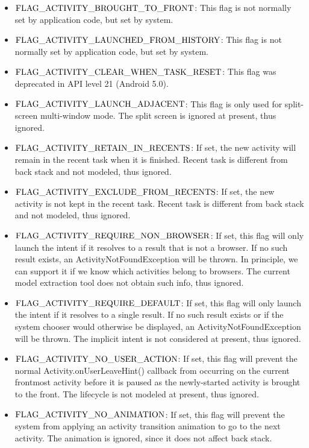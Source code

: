 {
\begin{itemize}
    \item $\rm FLAG\_ACTIVITY\_BROUGHT\_TO\_FRONT$: This flag is not normally set by application code, but set by system.
    \item $\rm FLAG\_ACTIVITY\_LAUNCHED\_FROM\_HISTORY$: This flag is not normally set by application code, but set by system.
%
    \item $\rm FLAG\_ACTIVITY\_CLEAR\_WHEN\_TASK\_RESET$: This flag was deprecated in API level 21 (Android 5.0).
%
    \item $\rm FLAG\_ACTIVITY\_LAUNCH\_ADJACENT$: This flag is only used for split-screen multi-window mode. The split screen is ignored at present, thus ignored.
%
    \item $\rm FLAG\_ACTIVITY\_RETAIN\_IN\_RECENTS$: If set, the new activity will remain in the recent task when it is finished. Recent task is different from back stack and not modeled, thus ignored.
%
    \item $\rm FLAG\_ACTIVITY\_EXCLUDE\_FROM\_RECENTS$: If set, the new activity is not kept in the recent task. Recent task is different from back stack and not modeled, thus ignored.
%
    \item $\rm FLAG\_ACTIVITY\_REQUIRE\_NON\_BROWSER$: If set, this flag will only launch the intent if it resolves to a result that is not a browser. If no such result exists, an ActivityNotFoundException will be thrown. In principle, we can support it if we know which activities belong to browsers. The current model extraction tool does not obtain such info, thus ignored.
%
    \item $\rm FLAG\_ACTIVITY\_REQUIRE\_DEFAULT$: If set, this flag will only launch the intent if it resolves to a single result. If no such result exists or if the system chooser would otherwise be displayed, an ActivityNotFoundException will be thrown. The implicit intent is not considered at present, thus ignored.
%
    \item $\rm FLAG\_ACTIVITY\_NO\_USER\_ACTION$: If set, this flag will prevent the normal Activity.onUserLeaveHint() callback from occurring on the current frontmost activity before it is paused as the newly-started activity is brought to the front. The lifecycle is not modeled at present, thus ignored.
%
    \item $\rm FLAG\_ACTIVITY\_NO\_ANIMATION$: If set, this flag will prevent the system from applying an activity transition animation to go to the next activity. The animation is ignored, since it does not affect back stack.

\end{itemize}}
